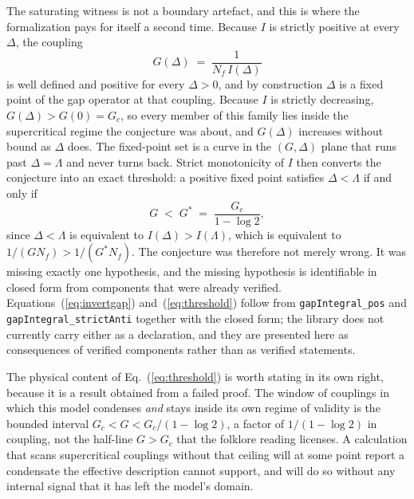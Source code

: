 \documentclass[11pt]{article}
\begin{document}
The saturating witness is not a boundary artefact, and this is where
the formalization pays for itself a second time. Because $I$ is
strictly positive at every $\Delta$, the coupling
\begin{equation}
  G(\Delta) \;=\; \frac{1}{N_f\,I(\Delta)}
  \label{eq:invertgap}
\end{equation}
is well defined and positive for every $\Delta > 0$, and by
construction $\Delta$ is a fixed point of the gap operator at that
coupling. Because $I$ is strictly decreasing, $G(\Delta) > G(0) = G_c$,
so every member of this family lies inside the supercritical regime the
conjecture was about, and $G(\Delta)$ increases without bound as
$\Delta$ does. The fixed-point set is a curve in the $(G,\Delta)$ plane
that runs past $\Delta = \Lambda$ and never turns back. Strict
monotonicity of $I$ then converts the conjecture into an exact
threshold: a positive fixed point satisfies $\Delta < \Lambda$ if and
only if
\begin{equation}
  G \;<\; G^{\ast} \;=\; \frac{G_c}{1-\log 2},
  \label{eq:threshold}
\end{equation}
since $\Delta < \Lambda$ is equivalent to $I(\Delta) > I(\Lambda)$,
which is equivalent to $1/(G N_f) > 1/(G^{\ast} N_f)$. The conjecture
was therefore not merely wrong. It was missing exactly one hypothesis,
and the missing hypothesis is identifiable in closed form from
components that were already verified. Equations~(\ref{eq:invertgap})
and~(\ref{eq:threshold}) follow from \texttt{gapIntegral\_pos} and
\texttt{gapIntegral\_strictAnti} together with the closed form; the
library does not currently carry either as a declaration, and they are
presented here as consequences of verified components rather than as
verified statements.

The physical content of Eq.~(\ref{eq:threshold}) is worth stating in
its own right, because it is a result obtained from a failed proof. The
window of couplings in which this model condenses \emph{and} stays
inside its own regime of validity is the bounded interval
$G_c < G < G_c/(1-\log 2)$, a factor of $1/(1-\log 2)$ in coupling, not
the half-line $G > G_c$ that the folklore reading licenses. A
calculation that scans supercritical couplings without that ceiling
will at some point report a condensate the effective description cannot
support, and will do so without any internal signal that it has left
the model's domain.
\end{document}
